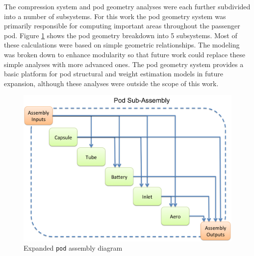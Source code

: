 \documentclass[heading.tex]{subfiles}
\begin{document}
The compression system and pod geometry analyses were each further subdivided into a number of subsystems. For this work the pod geometry 
system was primarily responsible for computing important areas throughout the passenger pod. Figure \ref{f:podXDSM} shows the 
pod geometry breakdown into 5 subsystems. Most of these calculations were based on simple geometric relationships. The 
modeling was broken down to enhance modularity so that future work could replace these simple analyses with more advanced ones.
The pod geometry system provides a basic platform for pod structural and weight estimation models in future expansion,
although these analyses were outside the scope of this work. 

\begin{figure}[hbtp]
\centering
\includegraphics[width=\textwidth]{images/podAssembly.png}
\caption{Expanded \texttt{pod} assembly diagram}
\label{f:podXDSM}
\end{figure}
\end{document}

